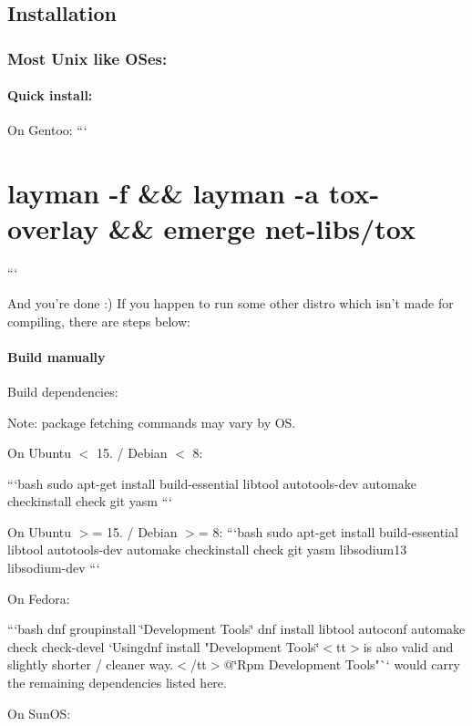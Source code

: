 \label{_installation}%
 \subsection*{Installation}

\label{_unix}%
 \subsubsection*{Most Unix like O\+Ses\+:}

\paragraph*{Quick install\+:}

On Gentoo\+: ``` \section*{layman -\/f \&\& layman -\/a tox-\/overlay \&\& emerge net-\/libs/tox}

```

And you're done {\ttfamily \+:)} If you happen to run some other distro which isn't made for compiling, there are steps below\+:

\paragraph*{Build manually}

Build dependencies\+:

Note\+: package fetching commands may vary by O\+S.

On Ubuntu {\ttfamily $<$ 15.} / Debian {\ttfamily $<$ 8}\+:

```bash sudo apt-\/get install build-\/essential libtool autotools-\/dev automake checkinstall check git yasm ```

On Ubuntu {\ttfamily $>$= 15.} / Debian {\ttfamily $>$= 8}\+: ```bash sudo apt-\/get install build-\/essential libtool autotools-\/dev automake checkinstall check git yasm libsodium13 libsodium-\/dev ```

On Fedora\+:

```bash dnf groupinstall \char`\"{}\+Development Tools\char`\"{} dnf install libtool autoconf automake check check-\/devel `{\ttfamily  Using}dnf install "Development Tools\char`\"{}$<$tt$>$is also valid and slightly shorter / cleaner way.$<$/tt$>$@\char`\"{}Rpm Development Tools"`` would carry the remaining dependencies listed here.

On Sun\+O\+S\+:

